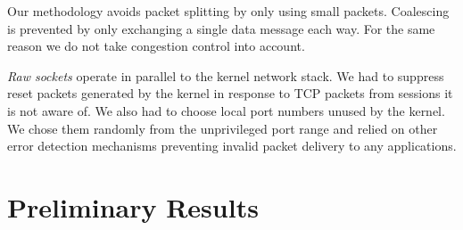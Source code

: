 \documentclass{sig-alternate-10pt}
\begin{document}
Our methodology avoids packet splitting by only using small packets. Coalescing is prevented by only exchanging a single data message each way. For the same reason we do not take congestion control into account.

\emph{Raw sockets} operate in parallel to the kernel network stack. We had to suppress reset packets generated by the kernel in response to TCP packets from sessions it is not aware of. We also had to choose local port numbers unused by the kernel. We chose them randomly from the unprivileged port range and relied on other error detection mechanisms preventing invalid packet delivery to any applications.

\section{Preliminary Results}
\label{sec:network}
\end{document}
